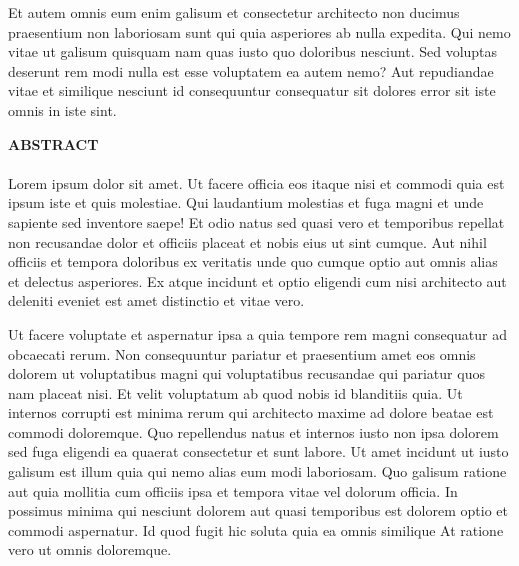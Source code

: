 \documentclass[a4paper,12pt]{report}
\begin{document}
\par Et autem omnis eum enim galisum et consectetur architecto non ducimus praesentium non laboriosam sunt qui quia asperiores ab nulla expedita. Qui nemo vitae ut galisum quisquam nam quas iusto quo doloribus nesciunt. Sed voluptas deserunt rem modi nulla est esse voluptatem ea autem nemo? Aut repudiandae vitae et similique nesciunt id consequuntur consequatur sit dolores error sit iste omnis in iste sint. 

\newpage

\begin{center}
\large \textbf{ABSTRACT}
\end{center}
\paragraph{}
\par Lorem ipsum dolor sit amet. Ut facere officia eos itaque nisi et commodi quia est ipsum iste et quis molestiae. Qui laudantium molestias et fuga magni et unde sapiente sed inventore saepe! Et odio natus sed quasi vero et temporibus repellat non recusandae dolor et officiis placeat et nobis eius ut sint cumque. Aut nihil officiis et tempora doloribus ex veritatis unde quo cumque optio aut omnis alias et delectus asperiores. Ex atque incidunt et optio eligendi cum nisi architecto aut deleniti eveniet est amet distinctio et vitae vero. 
\par Ut facere voluptate et aspernatur ipsa a quia tempore rem magni consequatur ad obcaecati rerum. Non consequuntur pariatur et praesentium amet eos omnis dolorem ut voluptatibus magni qui voluptatibus recusandae qui pariatur quos nam placeat nisi. Et velit voluptatum ab quod nobis id blanditiis quia. Ut internos corrupti est minima rerum qui architecto maxime ad dolore beatae est commodi doloremque. Quo repellendus natus et internos iusto non ipsa dolorem sed fuga eligendi ea quaerat consectetur et sunt labore. Ut amet incidunt ut iusto galisum est illum quia qui nemo alias eum modi laboriosam. Quo galisum ratione aut quia mollitia cum officiis ipsa et tempora vitae vel dolorum officia. In possimus minima qui nesciunt dolorem aut quasi temporibus est dolorem optio et commodi aspernatur. Id quod fugit hic soluta quia ea omnis similique At ratione vero ut omnis doloremque.



\setcounter{page}{1}
\setcounter{tocdepth}{1}
\renewcommand\contentsname{CONTENTS}
\tableofcontents
\listoffigures
 
\end{document}
